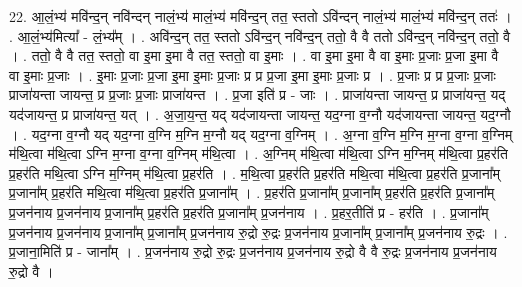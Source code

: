\documentclass[17pt]{extarticle}
\begin{document}
22. आ॒लं॒भ्य॑ मवि॑न्द॒न् नवि॑न्दन् नालं॒भ्य॑ मालं॒भ्य॑ मवि॑न्द॒न् तत॒ स्ततो ऽवि॑न्दन् नालं॒भ्य॑ मालं॒भ्य॑ मवि॑न्द॒न् ततः॑ । . आ॒लं॒भ्य॑मित्या᳚ - लं॒भ्य᳚म् । . अवि॑न्द॒न् तत॒ स्ततो ऽवि॑न्द॒न् नवि॑न्द॒न् ततो॒ वै वै ततो ऽवि॑न्द॒न् नवि॑न्द॒न् ततो॒ वै । . ततो॒ वै वै तत॒ स्ततो॒ वा इ॒मा इ॒मा वै तत॒ स्ततो॒ वा इ॒माः । . वा इ॒मा इ॒मा वै वा इ॒माः प्र॒जाः प्र॒जा इ॒मा वै वा इ॒माः प्र॒जाः । . इ॒माः प्र॒जाः प्र॒जा इ॒मा इ॒माः प्र॒जाः प्र प्र प्र॒जा इ॒मा इ॒माः प्र॒जाः प्र । . प्र॒जाः प्र प्र प्र॒जाः प्र॒जाः प्राजा॑यन्ता जायन्त॒ प्र प्र॒जाः प्र॒जाः प्राजा॑यन्त । . प्र॒जा इति॑ प्र - जाः । . प्राजा॑यन्ता जायन्त॒ प्र प्राजा॑यन्त॒ यद् यद॑जायन्त॒ प्र प्राजा॑यन्त॒ यत् । . अ॒जा॒य॒न्त॒ यद् यद॑जायन्ता जायन्त॒ यद॒ग्ना व॒ग्नौ यद॑जायन्ता जायन्त॒ यद॒ग्नौ । . यद॒ग्ना व॒ग्नौ यद् यद॒ग्ना व॒ग्नि म॒ग्नि म॒ग्नौ यद् यद॒ग्ना व॒ग्निम् । . अ॒ग्ना व॒ग्नि म॒ग्नि म॒ग्ना व॒ग्ना व॒ग्निम् म॑थि॒त्वा म॑थि॒त्वा ऽग्नि म॒ग्ना व॒ग्ना व॒ग्निम् म॑थि॒त्वा । . अ॒ग्निम् म॑थि॒त्वा म॑थि॒त्वा ऽग्नि म॒ग्निम् म॑थि॒त्वा प्र॒हर॑ति प्र॒हर॑ति मथि॒त्वा ऽग्नि म॒ग्निम् म॑थि॒त्वा प्र॒हर॑ति । . म॒थि॒त्वा प्र॒हर॑ति प्र॒हर॑ति मथि॒त्वा म॑थि॒त्वा प्र॒हर॑ति प्र॒जाना᳚म् प्र॒जाना᳚म् प्र॒हर॑ति मथि॒त्वा म॑थि॒त्वा प्र॒हर॑ति प्र॒जाना᳚म् । . प्र॒हर॑ति प्र॒जाना᳚म् प्र॒जाना᳚म् प्र॒हर॑ति प्र॒हर॑ति प्र॒जाना᳚म् प्र॒जन॑नाय प्र॒जन॑नाय प्र॒जाना᳚म् प्र॒हर॑ति प्र॒हर॑ति प्र॒जाना᳚म् प्र॒जन॑नाय । . प्र॒हर॒तीति॑ प्र - हर॑ति । . प्र॒जाना᳚म् प्र॒जन॑नाय प्र॒जन॑नाय प्र॒जाना᳚म् प्र॒जाना᳚म् प्र॒जन॑नाय रु॒द्रो रु॒द्रः प्र॒जन॑नाय प्र॒जाना᳚म् प्र॒जाना᳚म् प्र॒जन॑नाय रु॒द्रः । . प्र॒जाना॒मिति॑ प्र - जाना᳚म् । . प्र॒जन॑नाय रु॒द्रो रु॒द्रः प्र॒जन॑नाय प्र॒जन॑नाय रु॒द्रो वै वै रु॒द्रः प्र॒जन॑नाय प्र॒जन॑नाय रु॒द्रो वै । \newline
\end{document}
